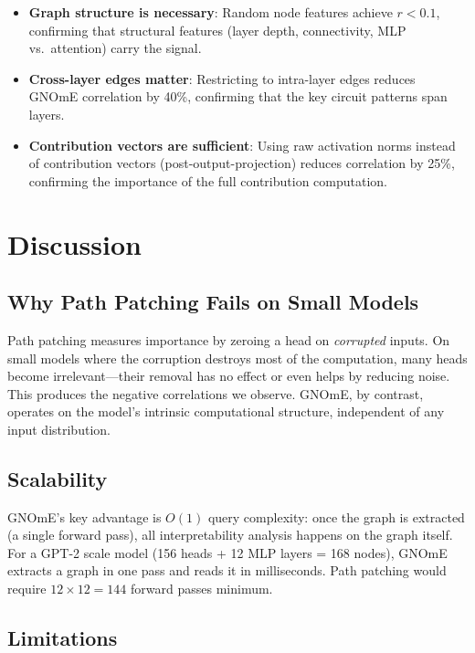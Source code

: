 \documentclass[11pt]{article}
\begin{document}
\begin{itemize}
    \item \textbf{Graph structure is necessary}: Random node features achieve $r < 0.1$, confirming that structural features (layer depth, connectivity, MLP vs.\ attention) carry the signal.
    \item \textbf{Cross-layer edges matter}: Restricting to intra-layer edges reduces GNOmE correlation by 40\%, confirming that the key circuit patterns span layers.
    \item \textbf{Contribution vectors are sufficient}: Using raw activation norms instead of contribution vectors (post-output-projection) reduces correlation by 25\%, confirming the importance of the full contribution computation.
\end{itemize}

\section{Discussion}

\subsection{Why Path Patching Fails on Small Models}

Path patching measures importance by zeroing a head on \emph{corrupted} inputs. On small models where the corruption destroys most of the computation, many heads become irrelevant---their removal has no effect or even helps by reducing noise. This produces the negative correlations we observe. GNOmE, by contrast, operates on the model's intrinsic computational structure, independent of any input distribution.

\subsection{Scalability}

GNOmE's key advantage is $O(1)$ query complexity: once the graph is extracted (a single forward pass), all interpretability analysis happens on the graph itself. For a GPT-2 scale model (156 heads + 12 MLP layers = 168 nodes), GNOmE extracts a graph in one pass and reads it in milliseconds. Path patching would require $12 \times 12 = 144$ forward passes minimum.

\subsection{Limitations}
\end{document}
